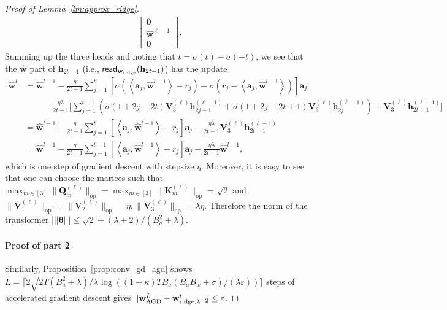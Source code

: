 \documentclass[10pt]{article}
\renewcommand{\hat}{\widehat}
\newcommand{\eps}{\varepsilon}
\newcommand{\lops}[1]{\|{#1}\|_{\mathrm{op}}}
\newcommand{\<}{\left\langle}
\renewcommand{\>}{\right\rangle}
\renewcommand{\bQ}{\mathbf{Q}}
\newcommand{\lth}{{(\ell)}}
\newcommand{\bzero}{{\mathbf 0}}
\renewcommand{\read}{{\sf read}}
\newcommand{\ridge}{{\rm ridge}}
\newcommand{\nrmp}[1]{{\left|\!\left|\!\left|{#1}\right|\!\right|\!\right|}}
\newcommand{\AGD}{{\mathrm{AGD}}}
\def\bK{{\mathbf K}}
\def\bQ{{\mathbf Q}}
\def\bV{{\mathbf V}}
\def\btheta{{\boldsymbol \theta}}
\def\ba{{\mathbf a}}
\def\bh{{\mathbf h}}
\def\bw{{\mathbf w}}
\begin{document}
\begin{proof}[Proof of Lemma~\ref{lm:approx_ridge}]
\begin{align*}
\begin{bmatrix}
        \bzero\\ \hat\bw^{\ell-1}\\ \bzero
    \end{bmatrix}.
\end{align*}
Summing up the three heads and noting that $t=\sigma(t)-\sigma(-t)$, we see that the $\hat\bw$ part of $\bh_{2t-1}$ (i.e., $\read_{\bw_\ridge}(\bh_{2t-1})$) has the update
\begin{align*}
    \hat\bw^{l}
    &=\hat\bw^{l-1}-\frac{\eta}{2t-1}\sum_{j=1}^t[\sigma(\<\ba_j,\hat\bw^{l-1}\>-r_j)-\sigma(r_j-\<\ba_j,\hat\bw^{l-1}\>)]\ba_j\\&
    \qquad
    -\frac{\eta\lambda}{2t-1}\Big[\sum_{j=1}^{t-1}(\sigma(1+2j-2t)\bV_3^{(\ell)}\bh^{(\ell-1)}_{2j-1}+\sigma(1+2j-2t+1)\bV_3^{(\ell)}\bh^{(\ell-1)}_{2j})+
   \bV_3^{(\ell)}\bh^{(\ell-1)}_{2t-1}\Big]\\
     &=\hat\bw^{l-1}-\frac{\eta}{2t-1}\sum_{j=1}^t[\<\ba_j,\hat\bw^{l-1}\>-r_j]\ba_j-\frac{\eta\lambda}{2t-1}\bV_3^{(\ell)}\bh^{(\ell-1)}_{2t-1}\\
     &=\hat\bw^{l-1}-\frac{\eta}{2t-1}\sum_{j=1}^{t-1}[\<\ba_j,\hat\bw^{l-1}\>-r_j]\ba_j-\frac{\eta\lambda}{2t-1}\hat\bw^{l-1},
\end{align*}
which is one step of gradient descent with stepsize $\eta$.  Moreover, it is easy to see that one can choose the marices such that $\max_{m\in[3]}\lops{\bQ^\lth_m}=\max_{m\in[3]}\lops{\bK^\lth_m}=\sqrt{2}$ and $\lops{\bV^\lth_1}=\lops{\bV^\lth_2}=\eta,\lops{\bV^\lth_3}= \lambda\eta$. Therefore the norm of the transformer $\nrmp{\btheta}\leq \sqrt{2}+(\lambda+2)/(B_a^2+\lambda)$.


\paragraph{Proof of part 2}
Similarly,  Proposition~\ref{prop:conv_gd_agd} shows $L=\lceil2\sqrt{2T(B_a^2+\lambda)/\lambda}\log((1+\kappa){TB_a(B_aB_w+\sigma)}/({\lambda}\eps))\rceil$ steps of accelerated gradient descent gives  $\|\bw^L_{\AGD}-\bw^t_{\ridge,\lambda}\|_2\leq\eps$.


\end{proof}
\end{document}
